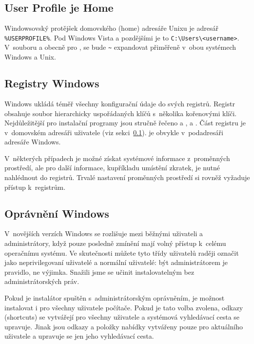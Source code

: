 \documentclass[\classoptions,slovak,english,czech]{\classname}
\begin{document}
\subsection{User Profile je Home}
\label{sec:winhome}
Windowsovský protějšek domovského (home) adresáře Unixu je adresář
\verb|%USERPROFILE%|.  Pod Windows Vista a pozdějšími je to 
\verb|C:\Users\<username>|.  V~souboru
 a obecně pro \KPS{}, se bude \verb|~| expandovat
přiměřeně v~obou systémech Windows a Unix.

\subsection{Registry Windows}
\label{sec:registry}
Windows ukládá téměř všechny konfigurační údaje do svých registrů. Registr 
obsahuje soubor hierarchicky uspořádaných klíčů s~několika kořenovými klíči. 
Nejdůležitější pro instalační programy jsou stručně řečeno 
 a ,  a
. Část  registru je v~domovském adresáři 
uživatele (viz sekci~\ref{sec:winhome}).  je 
obvykle v~podadresáři adresáře Windows.

V~některých případech je možné získat systémové informace z~proměnných
prostředí, ale pro další informace, kupříkladu umístění zkratek, je nutné
nahlédnout do registrů. Trvalé nastavení proměnných prostředí si rovněž
vyžaduje přístup k~registrům.

\subsection{Oprávnění Windows}
\label{sec:winpermissions}

V~novějších verzích Windows se rozlišuje mezi běžnými uživateli a
administrátory, když pouze posledně zmínění mají volný přístup k~celému
operačnímu systému. Ve skutečnosti můžete tyto třídy uživatelů raději
označit jako neprivilegovaní uživatelé a normální uživatelé: být
administrátorem je pravidlo, ne výjimka. Snažili jsme se učinit
\TL{} instalovatelným bez administrátorských práv. 

Pokud je instalátor spuštěn s~administrátorským oprávněním, je možnost instalovat 
i pro všechny uživatele počítače. Pokud je tato volba zvolena,
odkazy (shortcuts) se vytvářejí pro 
všechny uživatele a systémová vyhledávací cesta %
se upravuje. Jinak jsou odkazy a
položky nabídky vytvářeny pouze pro aktuálního uživatele a upravuje
se jen jeho vyhledávací cesta. %
\end{document}
